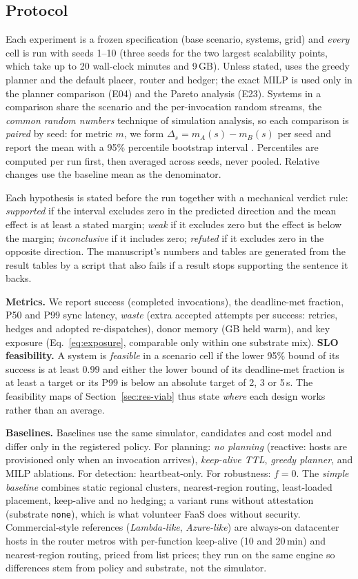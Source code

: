 \subsection{Protocol}
\label{sec:protocol}
Each experiment is a frozen specification (base scenario, systems, grid) and \emph{every} cell is run with seeds 1--10 (three seeds for the two largest scalability points, which take up to 20 wall-clock minutes and 9\,GB). Unless stated, \voss{} uses the greedy planner and the default placer, router and hedger; the exact MILP is used only
in the planner comparison (E04) and the Pareto analysis (E23). Systems in a comparison share the scenario and the per-invocation random streams, the \emph{common random numbers} technique of simulation analysis, so each comparison is \emph{paired} by seed: for metric $m$, we form
$\Delta_s=m_A(s)-m_B(s)$ per seed and report the mean with a 95\% percentile bootstrap interval \cite{efron1993bootstrap}. Percentiles are computed per run first, then averaged across seeds, never pooled. Relative changes use the baseline mean as the denominator.

Each hypothesis is stated before the run together with a mechanical verdict rule: \emph{supported} if the interval excludes zero in the predicted direction and the mean effect is at least a stated margin; \emph{weak} if it excludes zero but the effect is below the margin;
\emph{inconclusive} if it includes zero; \emph{refuted} if it excludes zero in the opposite direction. The manuscript's numbers and tables are generated from the result tables by a script that also fails if a result stops supporting the sentence it backs.

\textbf{Metrics.} We report success (completed invocations), the deadline-met fraction, P50 and P99 sync latency, \emph{waste} (extra accepted attempts per success: retries, hedges and adopted re-dispatches), donor memory (GB held warm), and key exposure (Eq.~\eqref{eq:exposure}, comparable only
within one substrate mix). \textbf{SLO feasibility.} A system is \emph{feasible} in a scenario cell if the lower 95\% bound of its success is at least $0.99$ and either the lower bound of its deadline-met fraction is at least a target or its P99 is below an absolute target of 2, 3 or 5\,s.
The feasibility maps of Section~\ref{sec:res-viab} thus state \emph{where} each design works rather than an average.

\textbf{Baselines.} Baselines use the same simulator, candidates and cost model and differ only in the registered policy. For planning: \emph{no planning} (reactive: hosts are provisioned only when an invocation arrives), \emph{keep-alive TTL}, \emph{greedy planner}, and MILP ablations. For detection: heartbeat-only. For robustness: $f=0$. The \emph{simple baseline} combines static regional
clusters, nearest-region routing, least-loaded placement, keep-alive and no hedging; a variant runs without attestation (substrate \texttt{none}), which is what volunteer FaaS does without security. Commercial-style references (\emph{Lambda-like}, \emph{Azure-like}) are always-on datacenter hosts in the
router metros with per-function keep-alive (10 and 20\,min) and nearest-region routing, priced from list prices; they run on the same engine so differences stem from policy and substrate, not the simulator.

